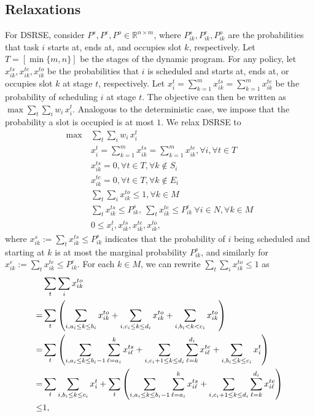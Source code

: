 \documentclass[final,5p,times,twocolumn]{elsarticle}
\newcommand{\R}{\mathbb{R}}
\begin{document}
\subsection{Relaxations}
For DSRSE, consider $P^s,P^e,P^o\in\R^{n\times m}$, where $P_{ik}^s,P_{ik}^e,P_{ik}^o$ are the probabilities that task $i$ starts at, ends at, and occupies slot $k$, respectively.
Let $T=[\min\{m,n\}]$ be the stages of the dynamic program.
For any policy, let $x_{ik}^{ts},x_{ik}^{te},x_{ik}^{to}$ be the probabilities that $i$ is scheduled and starts at, ends at, or occupies slot $k$ at stage $t$, respectively.
Let $x_i^t = \sum_{k=1}^m x_{ik}^{ts}=\sum_{k=1}^{m} x_{ik}^{te}$ be the probability of scheduling $i$ at stage $t$.
The objective can then be written as $ \max \sum_{t}\sum_i w_i\, x_{i}^t $.
Analogous to the deterministic case, we impose that the probability a slot is occupied is at most $1$.
We relax DSRSE to
\begin{align*}
    \max~&\sum_{t}\sum_i w_i\, x_{i}^{t}\\
    &x_i^t =\sum_{k=1}^{m}x_{ik}^{ts}=\sum_{k=1}^{m}x_{ik}^{te}, \forall i,\forall t\in T\\
    &x_{ik}^{ts}=0,\forall t\in T,\forall k\notin S_i\\
    &x_{ik}^{te}=0,\forall t\in T,\forall k\notin E_i\\
    &\sum_t\sum_i x_{ik}^{to}\leq 1,\forall k\in M\\
    &\sum_{t}x_{ik}^{ts}\leq P_{ik}^{s},~\sum_{t}x_{ik}^{te}\leq P_{ik}^{e}~\forall i\in N,\forall k\in M\\
    &0\leq x_{i}^{t}, x_{ik}^{ts},x_{ik}^{te}, x_{ik}^{to},
\end{align*}
where $x_{ik}^s:=\sum_{t}x_{ik}^{ts}\leq P_{ik}^s$ indicates that the probability of $i$ being scheduled and starting at $k$ is at most the marginal probability $P_{ik}^s$, and similarly for $x_{ik}^{e}:=\sum_t x_{ik}^{te}\leq P_{ik}^e$.
For each $k\in M$, we can rewrite $\sum_t\sum_i x_{ik}^{to}\leq 1$ as
\begin{align}
    &\sum_{t}\sum_{i}x_{ik}^{to}\notag \\
=&\sum_{t} \left(\sum_{i,a_i\leq k\leq b_i}x_{ik}^{to}+\sum_{i,c_i\leq k\leq d_i}x_{ik}^{to}+\sum_{i,b_i< k< c_i}x_{ik}^{to}\right) \notag \\
= &\sum_{t} \left(\sum_{i,a_i\leq k\leq b_i-1}\sum_{\ell = a_i}^{k}x_{i\ell}^{ts}+\sum_{i,c_i+1\leq k\leq d_i}\sum_{\ell =k}^{d_i}x_{i\ell}^{te}+\sum_{i,b_i\leq k\leq c_i}x_{i}^{t}\right)  \notag \\
=&\sum_{t}\sum_{i, b_i\leq k\leq c_i} x_i^t+\sum_t \left(\sum_{i,a_i\leq k\leq b_i-1}\sum_{\ell = a_i}^{k}x_{i\ell}^{ts}+\sum_{i,c_i+1\leq k\leq d_i}\sum_{\ell =k}^{d_i}x_{i\ell}^{te}\right)\notag \\
\leq &1,  \label{eq:1}
\end{align}
\end{document}
